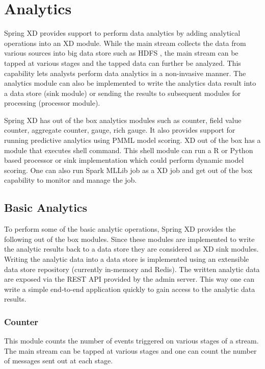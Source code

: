 \section{Analytics}
\label{sec:Analytics}

Spring XD provides support to perform data analytics by adding analytical operations into
an XD module. While the main stream collects the data from various sources into big data
store such as HDFS , the main stream can be tapped at various stages and the tapped data
can further be analyzed. This capability lets analysts perform data analytics in a
non-invasive manner. The analytics module can also be implemented to write the analytics
data result into a data store (sink module) or sending the results to subsequent modules
for processing (processor module). 

\par

Spring XD has out of the box analytics modules such as counter, field value counter,
aggregate counter, gauge, rich gauge. It also provides support for running predictive
analytics using PMML model scoring. XD out of the box has a module that executes
shell command. This shell module can run a R or Python based processor or sink 
implementation which could perform dynamic model scoring. One can also run Spark 
MLLib job as a XD job and get out of the box capability to monitor and manage the job.

\subsection {Basic Analytics}

To perform some of the basic analytic operations, Spring XD provides the following out of 
the box modules. Since these modules are implemented to write the analytic results 
back to a data store they are considered as XD sink modules. Writing the analytic 
data into a data store is implemented using an extensible data store repository 
(currently in-memory and Redis). 
The written analytic data are exposed via the REST API provided by the admin server.
This way one can write a simple end-to-end application quickly to gain access to the
analytic data results.

\subsubsection {Counter}

This module counts the number of events triggered on various stages of a stream.
The main stream can be tapped at various stages and one can count the number of
messages sent out at each stage.
 
